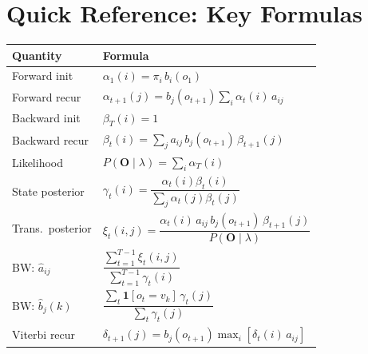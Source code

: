 \documentclass[12pt]{article}
\begin{document}
\newpage

\section*{Quick Reference: Key Formulas}

\begin{center}
\renewcommand{\arraystretch}{2.0}
\begin{tabular}{lp{9cm}}
\toprule
\textbf{Quantity} & \textbf{Formula} \\
\midrule
Forward init & $\alpha_1(i) = \pi_i\, b_i(o_1)$ \\
Forward recur & $\alpha_{t+1}(j) = b_j(o_{t+1})\sum_i \alpha_t(i)\,a_{ij}$ \\
Backward init & $\beta_T(i) = 1$ \\
Backward recur & $\beta_t(i) = \sum_j a_{ij}\,b_j(o_{t+1})\,\beta_{t+1}(j)$ \\
Likelihood & $P(\mathbf{O}\mid\lambda) = \sum_i \alpha_T(i)$ \\
State posterior & $\gamma_t(i) = \dfrac{\alpha_t(i)\beta_t(i)}{\sum_j \alpha_t(j)\beta_t(j)}$ \\
Trans.\ posterior & $\xi_t(i,j) = \dfrac{\alpha_t(i)\,a_{ij}\,b_j(o_{t+1})\,\beta_{t+1}(j)}{P(\mathbf{O}\mid\lambda)}$ \\
BW: $\hat{a}_{ij}$ & $\dfrac{\sum_{t=1}^{T-1}\xi_t(i,j)}{\sum_{t=1}^{T-1}\gamma_t(i)}$ \\
BW: $\hat{b}_j(k)$ & $\dfrac{\sum_t \mathbf{1}[o_t=v_k]\,\gamma_t(j)}{\sum_t \gamma_t(j)}$ \\
Viterbi recur & $\delta_{t+1}(j) = b_j(o_{t+1})\max_i[\delta_t(i)\,a_{ij}]$ \\
\bottomrule
\end{tabular}
\end{center}
\end{document}
